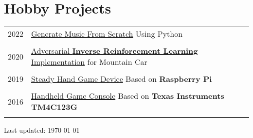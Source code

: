 \documentclass[a4paper,10pt]{article} %
\begin{document}
\section{Hobby Projects}
\begin{tabular}{r|l}	
	2022 &
	\href{https://medium.com/@jackhuang.wz/generate-music-from-scratch-using-python-53c0fedd0031}{Generate Music From Scratch}  Using Python\\
    \multicolumn{2}{c}{} \\	%
    
	2020						&
	\href{https://github.com/HuangJiaLian/AIRL_MountainCar}{Adversarial \textbf{Inverse Reinforcement Learning} Implementation} for Mountain Car \\
	\multicolumn{2}{c}{} \\	%
	
	2019						&
	\href{https://cdn.jsdelivr.net/gh/HuangJiaLian/DataBase0@master/uPic/2021_12_16_21_SteadyHand.jpeg}{Steady Hand Game Device} Based on \textbf{Raspberry Pi}\\	
	\multicolumn{2}{c}{} \\	%
	
	2016                        & \href{https://nbviewer.org/github/HuangJiaLian/DataBase0/blob/e193f936c297a5e97dfd8eae7b8c86288c721623/uPic/2021_12_16_21_Game_Boy.pdf}{Handheld Game Console} Based on \textbf{Texas Instruments TM4C123G}\\
	\multicolumn{2}{c}{} \\	%
\end{tabular}
\begin{flushright} 
Last updated: {\today}
\end{flushright}
\end{document}
